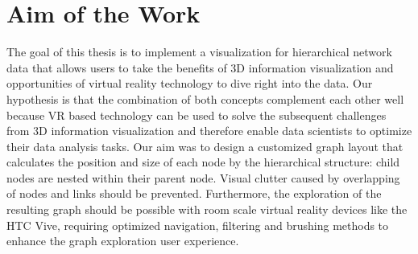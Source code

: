 \section{Aim of the Work}

The goal of this thesis is to implement a visualization for hierarchical network data that allows users to take the benefits of 3D information visualization and opportunities of virtual reality technology to dive right into the data. Our hypothesis is that the combination of both concepts complement each other well because VR based technology can be used to solve the subsequent challenges from 3D information visualization and therefore enable data scientists to optimize their data analysis tasks. 
Our aim was to design a customized graph layout that calculates the position and size of each node by the hierarchical structure: child nodes are nested within their parent node. 
Visual clutter caused by overlapping of nodes and links should be prevented. 
Furthermore, the exploration of the resulting graph should be possible with room scale virtual reality devices like the HTC Vive, requiring optimized navigation, filtering and brushing methods to enhance the graph exploration user experience.


